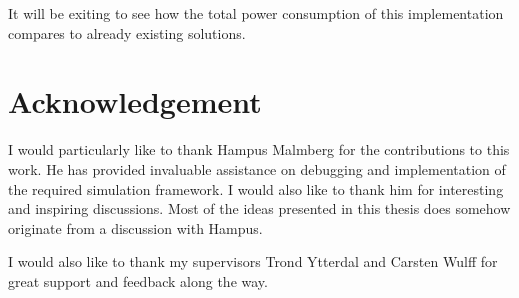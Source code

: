 It will be exiting to see how the total power consumption of this implementation compares to already existing solutions.

\newpage
\section*{Acknowledgement}
I would particularly like to thank Hampus Malmberg for the contributions to this work. He has provided invaluable assistance on debugging and implementation of the required simulation framework. I would also like to thank him for interesting and inspiring discussions. Most of the ideas presented in this thesis does somehow originate from a discussion with Hampus.

I would also like to thank my supervisors Trond Ytterdal and Carsten Wulff for great support and feedback along the way.
